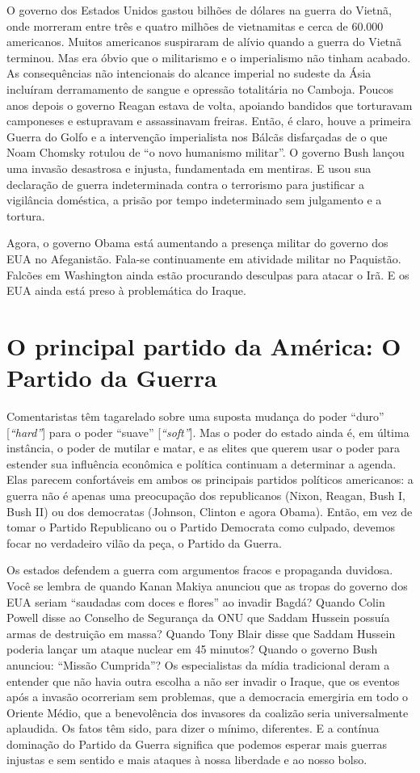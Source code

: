O governo dos Estados Unidos gastou bilhões de dólares na guerra do Vietnã, onde morreram entre três e quatro milhões de vietnamitas e cerca de 60.000 americanos. Muitos americanos suspiraram de alívio quando a guerra do Vietnã terminou. Mas era óbvio que o militarismo e o imperialismo não tinham acabado. As consequências não intencionais do alcance imperial no sudeste da Ásia incluíram derramamento de sangue e opressão totalitária no Camboja. Poucos anos depois o governo Reagan estava de volta, apoiando bandidos que torturavam camponeses e estupravam e assassinavam freiras. Então, é claro, houve a primeira Guerra do Golfo e a intervenção imperialista nos Bálcãs disfarçadas de o que Noam Chomsky rotulou de ``o novo humanismo militar''. O governo Bush lançou uma invasão desastrosa e injusta, fundamentada em mentiras. E usou sua declaração de guerra indeterminada contra o terrorismo para justificar a vigilância doméstica, a prisão por tempo indeterminado sem julgamento e a tortura.

Agora, o governo Obama está aumentando a presença militar do governo dos EUA no Afeganistão. Fala-se continuamente em atividade militar no Paquistão. Falcões em Washington ainda estão procurando desculpas para atacar o Irã. E os EUA ainda está preso à problemática do Iraque.

\section{O principal partido da América: O Partido da Guerra}

Comentaristas têm tagarelado sobre uma suposta mudança do poder ``duro'' [\emph{``hard''}] para o poder ``suave'' [\emph{``soft''}]. Mas o poder do estado ainda é, em última instância, o poder de mutilar e matar, e as elites que querem usar o poder para estender sua influência econômica e política continuam a determinar a agenda. Elas parecem confortáveis em ambos os principais partidos políticos americanos: a guerra não é apenas uma preocupação dos republicanos (Nixon, Reagan, Bush I, Bush II) ou dos democratas (Johnson, Clinton e agora Obama). Então, em vez de tomar o Partido Republicano ou o Partido Democrata como culpado, devemos focar no verdadeiro vilão da peça, o Partido da Guerra.

Os estados defendem a guerra com argumentos fracos e propaganda duvidosa. Você se lembra de quando Kanan Makiya anunciou que as tropas do governo dos EUA seriam ``saudadas com doces e flores'' ao invadir Bagdá? Quando Colin Powell disse ao Conselho de Segurança da ONU que Saddam Hussein possuía armas de destruição em massa? Quando Tony Blair disse que Saddam Hussein poderia lançar um ataque nuclear em 45 minutos? Quando o governo Bush anunciou: ``Missão Cumprida''? Os especialistas da mídia tradicional deram a entender que não havia outra escolha a não ser invadir o Iraque, que os eventos após a invasão ocorreriam sem problemas, que a democracia emergiria em todo o Oriente Médio, que a benevolência dos invasores da coalizão seria universalmente aplaudida. Os fatos têm sido, para dizer o mínimo, diferentes. E a contínua dominação do Partido da Guerra significa que podemos esperar mais guerras injustas e sem sentido e mais ataques à nossa liberdade e ao nosso bolso.

